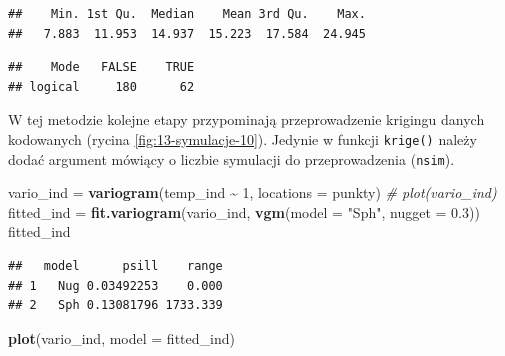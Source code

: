 \documentclass[
  paper=6in:9in,pagesize=pdftex,headinclude=on,footinclude=on,10pt]{scrbook}
\newenvironment{Shaded}{\begin{snugshade}}{\end{snugshade}}
\newcommand{\AttributeTok}[1]{\textcolor[rgb]{0.13,0.29,0.53}{#1}}
\newcommand{\CommentTok}[1]{\textcolor[rgb]{0.56,0.35,0.01}{\textit{#1}}}
\newcommand{\DecValTok}[1]{\textcolor[rgb]{0.00,0.00,0.81}{#1}}
\newcommand{\FloatTok}[1]{\textcolor[rgb]{0.00,0.00,0.81}{#1}}
\newcommand{\FunctionTok}[1]{\textcolor[rgb]{0.13,0.29,0.53}{\textbf{#1}}}
\newcommand{\NormalTok}[1]{#1}
\newcommand{\OtherTok}[1]{\textcolor[rgb]{0.56,0.35,0.01}{#1}}
\newcommand{\SpecialCharTok}[1]{\textcolor[rgb]{0.81,0.36,0.00}{\textbf{#1}}}
\newcommand{\StringTok}[1]{\textcolor[rgb]{0.31,0.60,0.02}{#1}}
\begin{document}
\begin{verbatim}
##    Min. 1st Qu.  Median    Mean 3rd Qu.    Max. 
##   7.883  11.953  14.937  15.223  17.584  24.945
\end{verbatim}

\begin{Shaded}
\end{Shaded}

\begin{verbatim}
##    Mode   FALSE    TRUE 
## logical     180      62
\end{verbatim}

W tej metodzie kolejne etapy przypominają przeprowadzenie krigingu danych kodowanych (rycina \ref{fig:13-symulacje-10}).
Jedynie w funkcji \texttt{krige()} należy dodać argument mówiący o liczbie symulacji do przeprowadzenia (\texttt{nsim}).

\begin{Shaded}
\begin{Highlighting}[]
\NormalTok{vario\_ind }\OtherTok{=} \FunctionTok{variogram}\NormalTok{(temp\_ind }\SpecialCharTok{\textasciitilde{}} \DecValTok{1}\NormalTok{, }\AttributeTok{locations =}\NormalTok{ punkty)}
\CommentTok{\# plot(vario\_ind)}
\NormalTok{fitted\_ind }\OtherTok{=} \FunctionTok{fit.variogram}\NormalTok{(vario\_ind,}
                            \FunctionTok{vgm}\NormalTok{(}\AttributeTok{model =} \StringTok{"Sph"}\NormalTok{, }\AttributeTok{nugget =} \FloatTok{0.3}\NormalTok{))}
\NormalTok{fitted\_ind}
\end{Highlighting}
\end{Shaded}

\begin{verbatim}
##   model      psill    range
## 1   Nug 0.03492253    0.000
## 2   Sph 0.13081796 1733.339
\end{verbatim}

\begin{Shaded}
\begin{Highlighting}[]
\FunctionTok{plot}\NormalTok{(vario\_ind, }\AttributeTok{model =}\NormalTok{ fitted\_ind)}
\end{Highlighting}
\end{Shaded}
\end{document}
